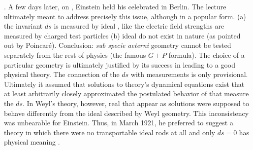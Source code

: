 \documentclass[draft]{article}
\newcommand{\WT}{Weyl's theory\xspace}
\newcommand{\WG}{Weyl geometry\xspace}
\begin{document}
{. A few days later, on , Einstein held his celebrated  in Berlin. The lecture ultimately meant to address precisely this issue, although in a popular form. (a) the invariant $ds$ is measured by ideal \rac, like the electric field strengths are measured by charged test particles (b) ideal \rac do not exist in nature (as pointed out by Poincaré). Conclusion: \emph{sub specie aeterni} geometry cannot be tested separately from the rest of physics (the famous $G+P$ formula). The choice of a particular geometry is ultimately justified by its success in leading to a good physical theory. The connection of the $ds$ with \rach measurements is only provisional. Ultimately it assumed that solutions to theory's dynamical equations exist that at least arbitrarily closely approximated the postulated behavior of \rac that measure the $ds$. In \WT, however, real \rac that appear as solutions were supposed to behave differently from the ideal \rac described by \WG. This inconsistency was unbearable for Einstein. Thus, in March 1921, he preferred to suggest a theory in which there were no transportable ideal rods at all and only $ds=0$ has physical meaning \citep{Einstein1921c}}.
\end{document}
